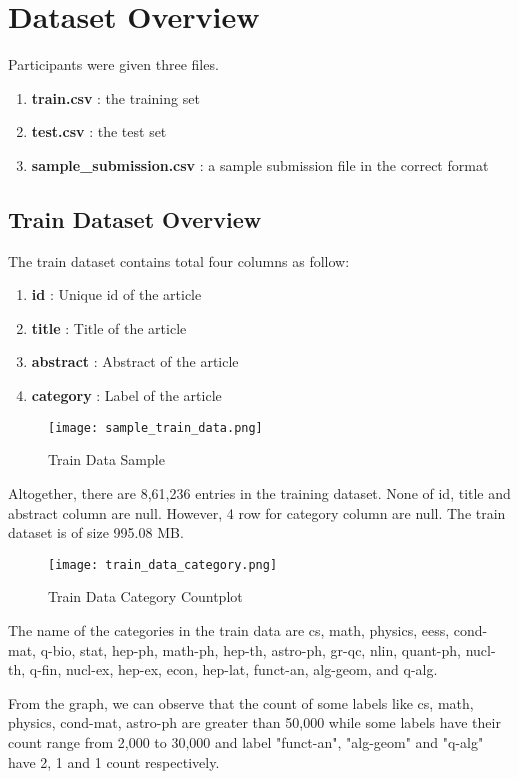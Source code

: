\section{Dataset Overview}
Participants were given three files.
\begin{enumerate}
    \item \textbf{train.csv} : the training set
    \item \textbf{test.csv} : the test set
    \item \textbf{sample\_submission.csv} : a sample submission file in the correct format
\end{enumerate}

\subsection{Train Dataset Overview}
The train dataset contains total four columns as follow:
\begin{enumerate}
    \item \textbf{id} : Unique id of the article
    \item \textbf{title} : Title of the article
    \item \textbf{abstract} : Abstract of the article
    \item \textbf{category} :  Label of the article
\end{enumerate}

\begin{figure}[H]
    \centering
    \texttt{[image: sample\_train\_data.png]}
    \caption{Train Data Sample}
    \label{fig:Train Data Sample}
\end{figure}

Altogether, there are 8,61,236 entries in the training dataset. None of id, title and abstract column are null. However, 4 row for category column are null. The train dataset is of size 995.08 MB.

\begin{figure}[H]
    \centering
    \texttt{[image: train\_data\_category.png]}
    \caption{Train Data Category Countplot}
    \label{fig:Train Data Category Countplot}
\end{figure}

The name of the categories in the train data are cs, math, physics, eess, cond-mat, q-bio, stat, hep-ph, math-ph, hep-th, astro-ph, gr-qc, nlin, quant-ph, nucl-th, q-fin, nucl-ex, hep-ex, econ,
hep-lat, funct-an, alg-geom, and q-alg.

From the graph, we can observe that the count of some labels like cs, math, physics, cond-mat, astro-ph are greater than 50,000 while some labels have their count range from 2,000 to 30,000 and label "funct-an", "alg-geom" and "q-alg" have 2, 1 and 1 count respectively.

